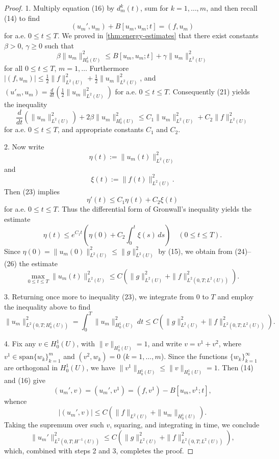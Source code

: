 \begin{proof}
1. Multiply equation (16) by $d^k_m(t)$, sum for $k = 1, \ldots, m$, and then recall (14) to find
\[
(u_m', u_m) + B[u_m, u_m; t] = (f, u_m)
\tag{21}
\]
for a.e. $0 \leq t \leq T$. We proved in \cref{thm:energy-estimates} that there exist constants $\beta > 0$, $\gamma \geq 0$ such that
\[
\beta\|u_m\|^2_{H^1_0(U)} \leq B[u_m, u_m; t] + \gamma\|u_m\|^2_{L^2(U)}
\tag{22}
\]
for all $0 \leq t \leq T$, $m = 1,\ldots$ Furthermore $|(f, u_m)| \leq \frac{1}{2}\|f\|^2_{L^2(U)} + \frac{1}{2}\|u_m\|^2_{L^2(U)}$, and $(u'_m, u_m) = \frac{d}{dt}\left(\frac{1}{2}\|u_m\|^2_{L^2(U)}\right)$ for a.e. $0 \leq t \leq T$. Consequently (21) yields the inequality
\[
\frac{d}{dt}\left(\|u_m\|^2_{L^2(U)}\right) + 2\beta\|u_m\|^2_{H^1_0(U)} \leq C_1\|u_m\|^2_{L^2(U)} + C_2\|f\|^2_{L^2(U)}
\tag{23}
\]
for a.e. $0 \leq t \leq T$, and appropriate constants $C_1$ and $C_2$.

2. Now write
\[
\eta(t) := \|u_m(t)\|^2_{L^2(U)}
\tag{24}
\]
and
\[
\xi(t) := \|f(t)\|^2_{L^2(U)}.
\tag{25}
\]
Then (23) implies
\[
\eta'(t) \leq C_1\eta(t) + C_2\xi(t)
\]
for a.e. $0 \leq t \leq T$. Thus the differential form of Gronwall's inequality yields the estimate
\[
\eta(t) \leq e^{C_1 t}\left(\eta(0) + C_2 \int_0^t \xi(s)\, ds\right) \quad (0 \leq t \leq T).
\tag{26}
\]
Since $\eta(0) = \|u_m(0)\|^2_{L^2(U)} \leq \|g\|^2_{L^2(U)}$ by (15), we obtain from (24)--(26) the estimate
\[
\max_{0 \leq t \leq T} \|u_m(t)\|^2_{L^2(U)} \leq C\left(\|g\|^2_{L^2(U)} + \|f\|^2_{L^2(0,T;L^2(U))}\right).
\]

3. Returning once more to inequality (23), we integrate from 0 to $T$ and employ the inequality above to find
\[
\|u_m\|^2_{L^2(0,T;H^1_0(U))} = \int_0^T \|u_m\|^2_{H^1_0(U)}\, dt \leq C\left(\|g\|^2_{L^2(U)} + \|f\|^2_{L^2(0,T;L^2(U))}\right).
\]

4. Fix any $v \in H^1_0(U)$, with $\|v\|_{H^1_0(U)} = 1$, and write $v = v^1 + v^2$, where $v^1 \in \text{span}\{w_k\}^m_{k=1}$ and $(v^2, w_k) = 0$ ($k = 1, \ldots, m$). Since the functions $\{w_k\}_{k=1}^\infty$ are orthogonal in $H_0^1(U)$, we have $\|v^1\|_{H_0^1(U)} \leq \|v\|_{H_0^1(U)} = 1$. Then (14) and (16) give
\[
(u_m', v) = (u_m', v^1) = (f, v^1) - B[u_m, v^1; t],
\]
whence
\[
|(u_m', v)| \leq C(\|f\|_{L^2(U)} + \|u_m\|_{H_0^1(U)}).
\]
Taking the supremum over such $v$, squaring, and integrating in time, we conclude
\[
\|u_m'\|^2_{L^2(0,T;H^{-1}(U))} \leq C\left(\|g\|^2_{L^2(U)} + \|f\|^2_{L^2(0,T;L^2(U))}\right),
\]
which, combined with steps 2 and 3, completes the proof.
\end{proof}

